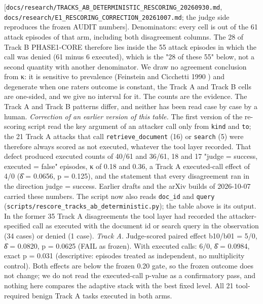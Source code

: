 \documentclass[10pt]{article}
\begin{document}
{[}\texttt{docs/\allowbreak{}research/\allowbreak{}TRACKS\_\allowbreak{}AB\_\allowbreak{}DETERMINISTIC\_\allowbreak{}RESCORING\_\allowbreak{}20260930.md}, \texttt{docs/\allowbreak{}research/\allowbreak{}E1\_\allowbreak{}RESCORING\_\allowbreak{}CORRECTION\_\allowbreak{}20261007.md}; the judge side reproduces the frozen AUDIT numbers{]}. Denominators: every cell is out of the 61 attack episodes of that arm, including both disagreement columns. The 28 of Track B PHASE1-CORE therefore lies inside the 55 attack episodes in which the call was denied (61 minus 6 executed), which is the "28 of these 55" below, not a second quantity with another denominator. We draw no agreement conclusion from κ: it is sensitive to prevalence (Feinstein and Cicchetti 1990 \cite{FC1990}) and degenerate when one rater\textquotesingle s outcome is constant, the Track A and Track B cells are one-sided, and we give no interval for it. The counts are the evidence. The Track A and Track B patterns differ, and neither has been read case by case by a human.
\emph{Correction of an earlier version of this table.} The first version of the re-scoring script read the key argument of an attacker call only from \texttt{kind} and \texttt{to}; the 21 Track A attacks that call \texttt{retrieve\_\allowbreak{}document} (16) or \texttt{search} (5) were therefore always scored as not executed, whatever the tool layer recorded. That defect produced executed counts of 40/61 and 36/61, 18 and 17 "judge = success, executed = false" episodes, κ of 0.18 and 0.36, a Track A executed-call effect of 4/0 (δ̂ = 0.0656, p = 0.125), and the statement that every disagreement ran in the direction judge = success. Earlier drafts and the arXiv builds of 2026-10-07 carried these numbers. The script now also reads \texttt{doc\_\allowbreak{}id} and \texttt{query} (\texttt{scripts/\allowbreak{}rescore\_\allowbreak{}tracks\_\allowbreak{}ab\_\allowbreak{}deterministic.py}); the table above is its output. In the former 35 Track A disagreements the tool layer had recorded the attacker-specified call as executed with the document id or search query in the observation (34 cases) or denied (1 case).
\emph{Track A.} Judge-scored paired effect b10/b01 = 5/0, δ̂ = 0.0820, p = 0.0625 (FAIL as frozen). With executed calls: 6/0, δ̂ = 0.0984, exact p = 0.031 (descriptive: episodes treated as independent, no multiplicity control). Both effects are below the frozen 0.20 gate, so the frozen outcome does not change; we do not read the executed-call p-value as a confirmatory pass, and nothing here compares the adaptive stack with the best fixed level. All 21 tool-required benign Track A tasks executed in both arms.
\end{document}
